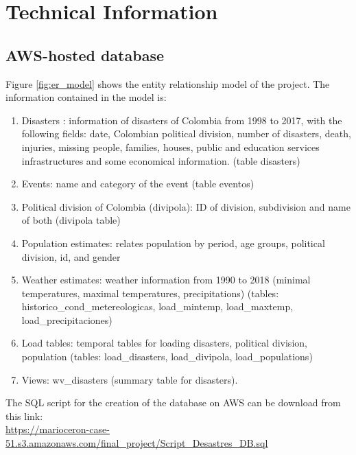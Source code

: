 \section{Technical Information}
\label{sec:Tech}

\subsection{AWS-hosted database}

Figure \ref{fig:er_model} shows the entity relationship model of the project. The information contained in the model is:

\begin{enumerate}

\item Disasters : information of disasters of Colombia from 1998 to 2017, with the following fields: date,  Colombian political division, number of disasters, death, injuries, missing people, families, houses, public and education services infrastructures and some economical  information. (table disasters)
\item Events: name and category of the event (table eventos)
 
\item Political division of Colombia (divipola): ID of division, subdivision and name of both (divipola table)

\item Population estimates: relates population by period, age groups, political division, id, and gender

\item Weather estimates:  weather information from 1990 to 2018 (minimal temperatures, maximal temperatures, precipitations) (tables: historico\_cond\_metereologicas, load\_mintemp, load\_maxtemp, load\_precipitaciones)	


\item Load tables: temporal tables for loading disasters, political division, population (tables: load\_disasters, load\_divipola, load\_populations)

\item Views: wv\_disasters (summary table for disasters). 

\end{enumerate}

The SQL script for the creation of the database on AWS can be download from this link: \\ \url{https://marioceron-case-51.s3.amazonaws.com/final_project/Script_Desastres_DB.sql}{}

